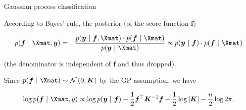 \begin{vbframe}{Gaussian process classification}
\framebreak 










According to Bayes' rule, the posterior (of the score function $\bm{f}$)

\vspace*{-0.5cm}

\begin{eqnarray*}
  p(\bm{f} ~|~ \Xmat, \yv) &=&  \frac{p(\yv ~|~ \bm{f}, \Xmat) \cdot p(\bm{f} ~|~ \Xmat)}{p(\yv ~|~\Xmat)} \propto p(\yv ~|~ \bm{f}) \cdot p(\bm{f} ~|~ \Xmat)
\end{eqnarray*}

(the denominator is independent of $\bm{f}$ and thus dropped).

\lz 

Since $p(\bm{f} ~|~ \Xmat) \sim \mathcal{N}\left(0, \bm{K}\right)$ by the GP assumption, we have

\vspace*{-0.2cm}

$$
  \log p(\bm{f} ~|~ \Xmat, y) \propto \log p(\yv ~|~ \bm{f}) - \frac{1}{2} \bm{f}^\top \bm{K}^{-1} \bm{f} - \frac{1}{2} \log |\bm{K}| - \frac{n}{2} \log 2 \pi. 
$$


\end{vbframe}
